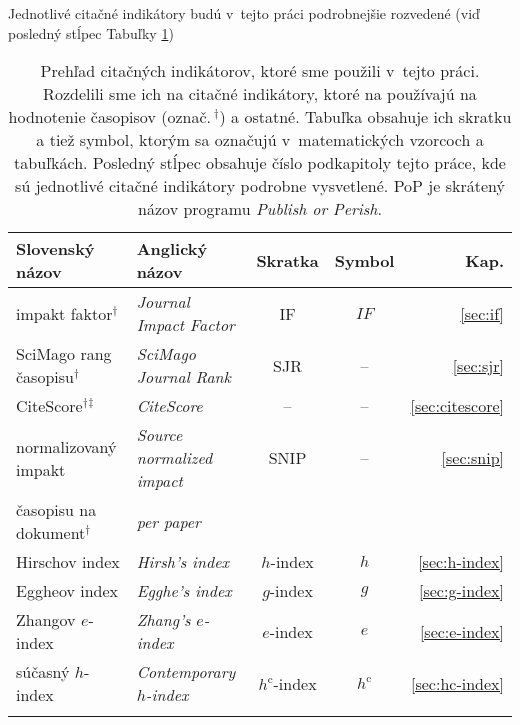 Jednotlivé citačné indikátory budú v~tejto práci podrobnejšie
rozvedené (viď posledný stĺpec Tabuľky \ref{tab:indicators.review})

\begin{table}
  \caption[Prehľad citačných indikátorov]%
  {Prehľad citačných indikátorov, ktoré sme použili v~tejto práci. Rozdelili sme
    ich na citačné indikátory, ktoré na používajú na hodnotenie časopisov
    (označ.\,$^\dagger$) a ostatné. Tabuľka obsahuje ich skratku a tiež symbol,
    ktorým sa označujú v~matematických vzorcoch a tabuľkách. Posledný stĺpec
     obsahuje číslo podkapitoly tejto práce, kde sú jednotlivé citačné
    indikátory podrobne vysvetlené. PoP je skrátený názov programu
    \emph{Publish or Perish}.}
  \label{tab:indicators.review}
  \centering\small
  \begin{tabularx}{\textwidth}{llccr}
    \toprule
    Slovenský  názov & Anglický názov & Skratka & Symbol & Kap. \\
    \midrule
    impakt faktor$^\dagger$         & \emph{Journal Impact Factor}           & IF                  & $\mathit{IF}$     & \ref{sec:if}        \\[0.5ex]
    SciMago rang časopisu$^\dagger$ & \emph{SciMago Journal Rank}            & SJR                 & --                & \ref{sec:sjr}       \\[0.5ex]
    CiteScore$^\dagger$$^\ddagger$    & \emph{CiteScore}                       & --                  & --               & \ref{sec:citescore}  \\[0.5ex]
    normalizovaný impakt           & \emph{Source normalized impact}        & SNIP                & --                & \ref{sec:snip}      \\[-0.25ex]
    časopisu  na dokument$^\dagger$  & \emph{per paper}                       &                     &                   &                     \\[0.5ex]
    Hirschov index                 & \emph{Hirsh's index}                   & $h$-index           & $h$                & \ref{sec:h-index}  \\[1.5ex]
    Eggheov index                  & \emph{Egghe's index}                   & $g$-index           & $g$                & \ref{sec:g-index}  \\[0.5ex]
    Zhangov $e$-index              & \emph{Zhang's $e$-index}               & $e$-index           & $e$                & \ref{sec:e-index}  \\[0.5ex]
    súčasný $h$-index              & \emph{Contemporary $h$-index}          & $h^{\mathrm{c}}$-index & $h^{\mathrm{c}}$     & \ref{sec:hc-index}  \\[0.5ex]
$$
\end{tabularx}
\end{table}
